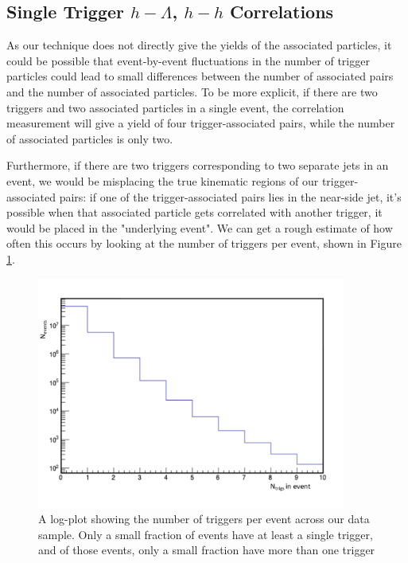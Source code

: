 \documentclass[ALICE,manyauthors]{ALICE_analysis_notes}
\begin{document}
\subsection{Single Trigger $h-\Lambda$, $h-h$ Correlations}

As our technique does not directly give the yields of the associated particles, it could be possible that event-by-event fluctuations in the number of trigger particles could lead to small differences between the number of associated pairs and the number of associated particles. To be more explicit, if there are two triggers and two associated particles in a single event, the correlation measurement will give a yield of four trigger-associated pairs, while the number of associated particles is only two. 

Furthermore, if there are two triggers corresponding to two separate jets in an event, we would be misplacing the true kinematic regions of our trigger-associated pairs: if one of the trigger-associated pairs lies in the near-side jet, it's possible when that associated particle gets correlated with another trigger, it would be placed in the "underlying event". We can get a rough estimate of how often this occurs by looking at the number of triggers per event, shown in Figure \ref{trigs_per_event}.

\begin{figure}[ht]
\centering
\includegraphics[width=4in]{figures/trig_per_event.pdf}
\caption{A log-plot showing the number of triggers per event across our data sample. Only a small fraction of events have at least a single trigger, and of those events, only a small fraction have more than one trigger}
\label{trigs_per_event}
\end{figure}
\end{document}
